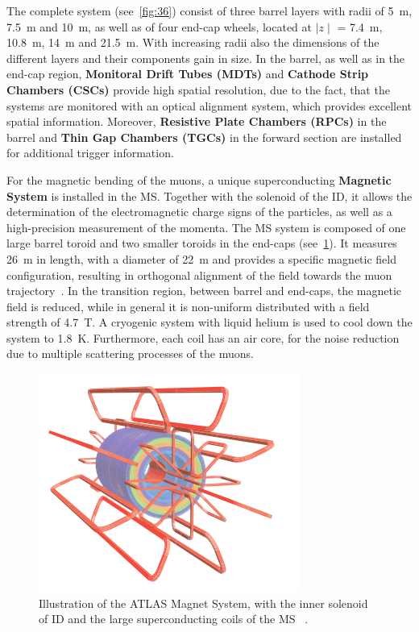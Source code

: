  The complete system (see~\cref{fig:36}) consist of three barrel layers with radii of  5~m, 7.5~m and 10~m, as well as of four end-cap wheels, located at $\mid z \mid$ = 7.4~m, 10.8~m, 14~m and 21.5~m. 
With increasing radii also the dimensions of the different layers and their components gain in size. In the barrel, as well as in the end-cap region, \textbf{Monitoral Drift Tubes (MDTs)} and \textbf{Cathode Strip Chambers (CSCs)} provide high spatial resolution, due to the fact, that the systems are monitored with an optical alignment system, which provides excellent spatial information. Moreover, \textbf{Resistive Plate Chambers (RPCs)} in the barrel and \textbf{Thin Gap Chambers (TGCs)} in the forward section are  installed for additional trigger information.



 For the magnetic bending of the muons, a unique superconducting \textbf{Magnetic System} is installed in the MS. Together with the solenoid of the ID, it allows the determination of the electromagnetic charge signs of the particles, as well as a high-precision measurement of the momenta. The MS system is composed of one large barrel toroid and two smaller toroids in the end-caps (see~\cref{fig:37}). It measures  26~m in length, with a diameter of 22~m and provides a specific magnetic field configuration, resulting in orthogonal alignment of the field towards the muon trajectory~\cite{ATLAS:1999uwa}. In the transition region, between barrel and end-caps, the magnetic field is reduced, while in general it is  non-uniform distributed  with a field strength of 4.7~T.  A cryogenic system with liquid helium is used to cool down the system to 1.8~K. Furthermore,  each coil has an air core, for the noise reduction due to  multiple scattering processes of the muons. 

\begin{figure}[h]
	\centering
	\includegraphics[width=0.4\linewidth]{Pics/cp3/37}
	\caption{Illustration of the ATLAS Magnet System, with the inner solenoid of ID and the large superconducting coils of the MS ~\cite{Aad:2008zzm}.} 
	\label{fig:37}
\end{figure}



